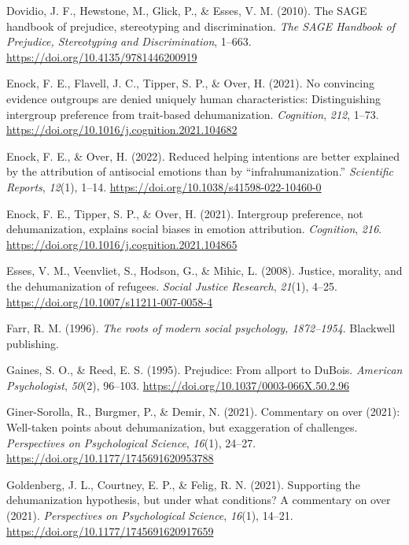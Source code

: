\documentclass[
]{article}
\newlength{\cslhangindent}
\newlength{\cslentryspacingunit} %
\newenvironment{CSLReferences}[2] %
 {%
  \setlength{\parindent}{0pt}
  \ifodd #1
  \let\oldpar\par
  \def\par{\hangindent=\cslhangindent\oldpar}
  \fi
  \setlength{\parskip}{#2\cslentryspacingunit}
 }%
 {}
\begin{document}
\begin{CSLReferences}{1}{0}
\leavevmode{}%
Dovidio, J. F., Hewstone, M., Glick, P., \& Esses, V. M. (2010). The SAGE handbook of prejudice, stereotyping and discrimination. \emph{The SAGE Handbook of Prejudice, Stereotyping and Discrimination}, 1--663. \url{https://doi.org/10.4135/9781446200919}

\leavevmode{}%
Enock, F. E., Flavell, J. C., Tipper, S. P., \& Over, H. (2021). No convincing evidence outgroups are denied uniquely human characteristics: Distinguishing intergroup preference from trait-based dehumanization. \emph{Cognition}, \emph{212}, 1--73. \url{https://doi.org/10.1016/j.cognition.2021.104682}

\leavevmode{}%
Enock, F. E., \& Over, H. (2022). Reduced helping intentions are better explained by the attribution of antisocial emotions than by {``infrahumanization.''} \emph{Scientific Reports}, \emph{12}(1), 1--14. \url{https://doi.org/10.1038/s41598-022-10460-0}

\leavevmode{}%
Enock, F. E., Tipper, S. P., \& Over, H. (2021). Intergroup preference, not dehumanization, explains social biases in emotion attribution. \emph{Cognition}, \emph{216}. \url{https://doi.org/10.1016/j.cognition.2021.104865}

\leavevmode{}%
Esses, V. M., Veenvliet, S., Hodson, G., \& Mihic, L. (2008). Justice, morality, and the dehumanization of refugees. \emph{Social Justice Research}, \emph{21}(1), 4--25. \url{https://doi.org/10.1007/s11211-007-0058-4}

\leavevmode{}%
Farr, R. M. (1996). \emph{The roots of modern social psychology, 1872--1954}. Blackwell publishing.

\leavevmode{}%
Gaines, S. O., \& Reed, E. S. (1995). Prejudice: From allport to DuBois. \emph{American Psychologist}, \emph{50}(2), 96--103. \url{https://doi.org/10.1037/0003-066X.50.2.96}

\leavevmode{}%
Giner-Sorolla, R., Burgmer, P., \& Demir, N. (2021). Commentary on over (2021): Well-taken points about dehumanization, but exaggeration of challenges. \emph{Perspectives on Psychological Science}, \emph{16}(1), 24--27. \url{https://doi.org/10.1177/1745691620953788}

\leavevmode{}%
Goldenberg, J. L., Courtney, E. P., \& Felig, R. N. (2021). Supporting the dehumanization hypothesis, but under what conditions? A commentary on over (2021). \emph{Perspectives on Psychological Science}, \emph{16}(1), 14--21. \url{https://doi.org/10.1177/1745691620917659}


\end{CSLReferences}
\end{document}
